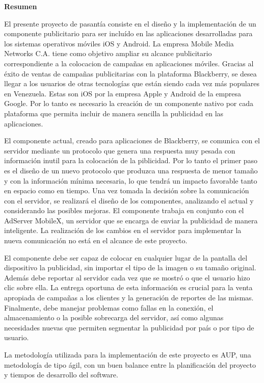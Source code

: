 \renewcommand{\thepage}{\Roman{page}}

\setcounter{page}{4} 

\begin{center}
\textbf{\large Resumen}
\par\end{center}{\large \par}

\vspace{5mm}


El presente proyecto de pasantía consiste en el diseño y la implementación
de un componente publicitario para ser incluído en las aplicaciones
desarrolladas para los sistemas operativos móviles iOS y Android.
La empresa Mobile Media Networks C.A. tiene como objetivo ampliar
su alcance publicitario correspondiente a la colocacion de campañas
en aplicaciones móviles. Gracias al éxito de ventas de campañas publicitarias
con la plataforma Blackberry, se desea llegar a los usuarios de otras
tecnologías que están siendo cada vez más populares en Venezuela.
Estas son iOS por la empresa Apple y Android de la empresa Google.
Por lo tanto es necesario la creación de un componente nativo por
cada plataforma que permita incluir de manera sencilla la publicidad
en las aplicaciones.

El componente actual, creado para aplicaciones de Blackberry, se comunica
con el servidor mediante un protocolo que genera una respuesta muy
pesada con información inutil para la colocación de la piblicidad.
Por lo tanto el primer paso es el diseño de un nuevo protocolo que
produzca una respuesta de menor tamaño y con la información mínima
necesaria, lo que tendrá un impacto favorable tanto en espacio como
en tiempo. Una vez tomada la decisión sobre la comunicación con el
servidor, se realizará el diseño de los componentes, analizando el
actual y considerando las posibles mejoras. El componente trabaja
en conjunto con el AdServer MobileX, un servidor que se encarga de
enviar la publicidad de manera inteligente. La realización de los
cambios en el servidor para implementar la nueva comunicación no está
en el alcance de este proyecto.

El componente debe ser capaz de colocar en cualquier lugar de la pantalla
del dispositivo la publicidad, sin importar el tipo de la imagen o
su tamaño original. Además debe reportar al servidor cada vez que
se mostró o que el usuario hizo clic sobre ella. La entrega oportuna
de esta información es crucial para la venta apropiada de campañas
a los clientes y la generación de reportes de las mismas. Finalmente,
debe manejar problemas como fallas en la conexión, el almacenamiento
o la posible sobrecarga del servidor, así como algunas necesidades
nuevas que permiten segmentar la publicidad por país o por tipo de
usuario. 

\begin{onehalfspace}
La metodología utilizada para la implementación de este proyecto es
AUP, una metodología de tipo ágil, con un buen balance entre la planificación
del proyecto y tiempos de desarrollo del software.\newpage{}\end{onehalfspace}

